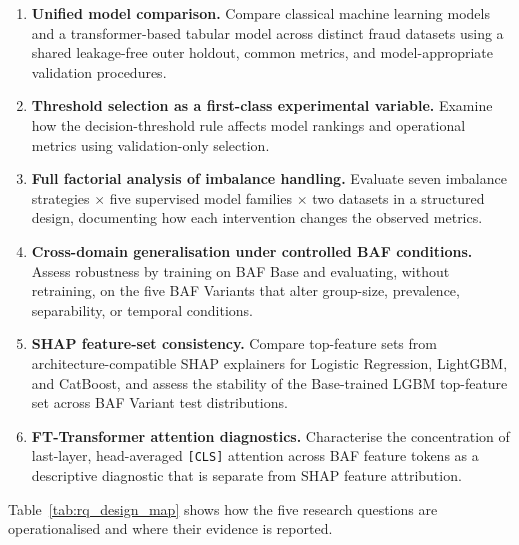 \begin{enumerate}
  \item \textbf{Unified model comparison.} Compare classical machine learning models and a transformer-based tabular model across distinct fraud datasets using a shared leakage-free outer holdout, common metrics, and model-appropriate validation procedures.

  \item \textbf{Threshold selection as a first-class experimental variable.} Examine how the decision-threshold rule affects model rankings and operational metrics using validation-only selection.

  \item \textbf{Full factorial analysis of imbalance handling.} Evaluate seven imbalance strategies $\times$ five supervised model families $\times$ two datasets in a structured design, documenting how each intervention changes the observed metrics.

  \item \textbf{Cross-domain generalisation under controlled BAF conditions.} Assess robustness by training on BAF Base and evaluating, without retraining, on the five BAF Variants that alter group-size, prevalence, separability, or temporal conditions.

  \item \textbf{SHAP feature-set consistency.} Compare top-feature sets from architecture-compatible SHAP explainers for Logistic Regression, LightGBM, and CatBoost, and assess the stability of the Base-trained LGBM top-feature set across BAF Variant test distributions.

  \item \textbf{FT-Transformer attention diagnostics.} Characterise the concentration of last-layer, head-averaged \texttt{[CLS]} attention across BAF feature tokens as a descriptive diagnostic that is separate from SHAP feature attribution.
\end{enumerate}

Table~\ref{tab:rq_design_map} shows how the five research questions are operationalised and where their evidence is reported.

